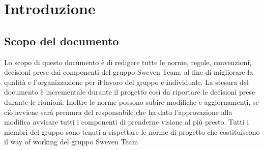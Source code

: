 \section{Introduzione}
\subsection{Scopo del documento}
Lo scopo di questo documento è di redigere tutte le norme, regole, convenzioni, decisioni 
prese dai componenti del gruppo Sweven Team, al fine di migliorare la qualità e l'organizzazione
per il lavoro del gruppo e individuale. \newline
La stesura del documento è incrementale durante il progetto così da riportare le decisioni
prese durante le riunioni. Inoltre le norme possono subire modifiche e aggiornamenti,
se ciò avviene sarà premura del responsabile che ha dato l'approvazione alla modifica 
avvisare tutti i componenti di prenderne visione al più presto. \newline 
Tutti i membri del gruppo sono tenuti a rispettare le norme di progetto che costituiscono
il way of working del gruppo Sweven Team
\newpage